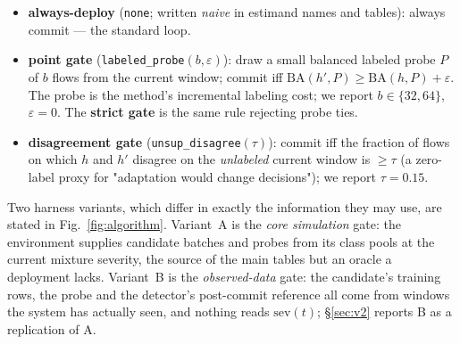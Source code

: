 \documentclass[a4paper,fleqn]{cas-sc}
\begin{document}
\begin{itemize}
  \item \textbf{always-deploy} (\texttt{none}; written \emph{naive} in estimand names and tables): always commit --- the standard loop.
  \item \textbf{point gate} (\texttt{labeled\_probe}$(b,\varepsilon)$): draw a small balanced labeled probe $P$ of $b$ flows from the current window; commit iff $\mathrm{BA}(h',P) \ge \mathrm{BA}(h,P) + \varepsilon$. The probe is the method's incremental labeling cost; we report $b\in\{32,64\}$, $\varepsilon=0$. The \textbf{strict gate} is the same rule rejecting probe ties.
  \item \textbf{disagreement gate} (\texttt{unsup\_disagree}$(\tau)$): commit iff the fraction of flows on which $h$ and $h'$ disagree on the \emph{unlabeled} current window is $\ge \tau$ (a zero-label proxy for "adaptation would change decisions"); we report $\tau=0.15$.
\end{itemize}

Two harness variants, which differ in exactly the information they may use, are stated in Fig.~\ref{fig:algorithm}. Variant~A is the \emph{core simulation} gate: the environment supplies candidate batches and probes from its class pools at the current mixture severity, the source of the main tables but an oracle a deployment lacks. Variant~B is the \emph{observed-data} gate: the candidate's training rows, the probe and the detector's post-commit reference all come from windows the system has actually seen, and nothing reads $\mathrm{sev}(t)$; \S\ref{sec:v2} reports B as a replication of A.
\end{document}
